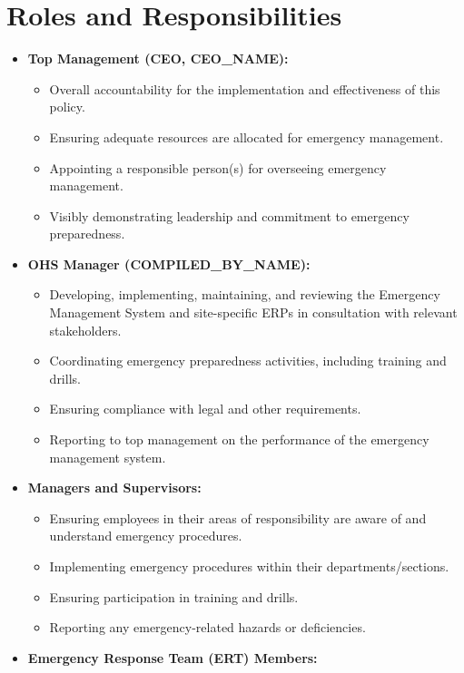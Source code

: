 \documentclass[12pt]{article}
\begin{document}
\section{Roles and Responsibilities}
\begin{itemize}
    \item \textbf{Top Management (CEO, {{CEO_NAME}}):}
    \begin{itemize}
        \item Overall accountability for the implementation and effectiveness of this policy.
        \item Ensuring adequate resources are allocated for emergency management.
        \item Appointing a responsible person(s) for overseeing emergency management.
        \item Visibly demonstrating leadership and commitment to emergency preparedness.
    \end{itemize}
    \item \textbf{OHS Manager ({{COMPILED_BY_NAME}}):}
    \begin{itemize}
        \item Developing, implementing, maintaining, and reviewing the Emergency Management System and site-specific ERPs in consultation with relevant stakeholders.
        \item Coordinating emergency preparedness activities, including training and drills.
        \item Ensuring compliance with legal and other requirements.
        \item Reporting to top management on the performance of the emergency management system.
    \end{itemize}
    \item \textbf{Managers and Supervisors:}
    \begin{itemize}
        \item Ensuring employees in their areas of responsibility are aware of and understand emergency procedures.
        \item Implementing emergency procedures within their departments/sections.
        \item Ensuring participation in training and drills.
        \item Reporting any emergency-related hazards or deficiencies.
    \end{itemize}
    \item \textbf{Emergency Response Team (ERT) Members:}
    \begin{itemize}

\end{itemize}
\end{itemize}
\end{document}
